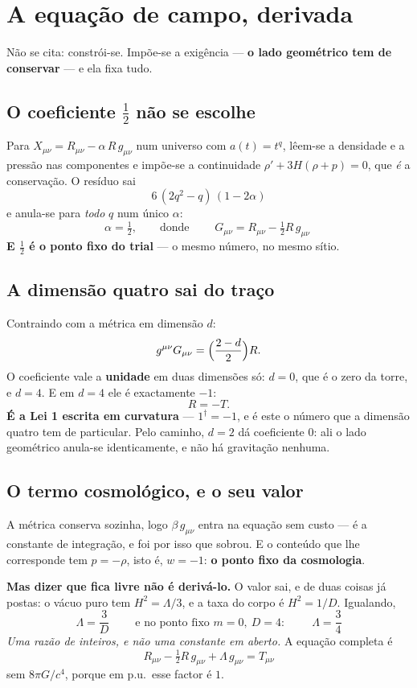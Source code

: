 \documentclass[11pt,a4paper]{article}
\newcommand{\dg}{^{\dagger}}
\begin{document}
\section{A equação de campo, derivada}\label{sec:campo2}

Não se cita: constrói-se. Impõe-se a exigência --- \textbf{o lado geométrico tem de conservar} --- e
ela fixa tudo.

\subsection*{O coeficiente $\tfrac12$ não se escolhe}

Para $X_{\mu\nu}=R_{\mu\nu}-\alpha\,R\,g_{\mu\nu}$ num universo com $a(t)=t^q$, lêem-se a densidade
e a pressão nas componentes e impõe-se a continuidade $\rho'+3H(\rho+p)=0$, que \emph{é} a
conservação. O resíduo sai
\[
  \boxed{\;6\,(2q^2-q)\,(1-2\alpha)\;}
\]
e anula-se para \emph{todo} $q$ num único $\alpha$:
\[
  \alpha=\tfrac12,\qquad\text{donde}\qquad \boxed{\;G_{\mu\nu}=R_{\mu\nu}-\tfrac12R\,g_{\mu\nu}\;}
\]
\textbf{E $\tfrac12$ é o ponto fixo do trial} --- o mesmo número, no mesmo sítio.

\subsection*{A dimensão quatro sai do traço}

Contraindo com a métrica em dimensão $d$:
\[
  g^{\mu\nu}G_{\mu\nu}=\Bigl(\frac{2-d}{2}\Bigr)R .
\]
O coeficiente vale a \textbf{unidade} em duas dimensões só: $d=0$, que é o zero da torre, e
$d=4$. E em $d=4$ ele é exactamente $-1$:
\[
  R=-T .
\]
\textbf{É a Lei 1 escrita em curvatura} --- $1\dg=-1$, e é este o número que a dimensão quatro tem
de particular. Pelo caminho, $d=2$ dá coeficiente $0$: ali o lado geométrico anula-se
identicamente, e não há gravitação nenhuma.

\subsection*{O termo cosmológico, e o seu valor}

A métrica conserva sozinha, logo $\beta\,g_{\mu\nu}$ entra na equação sem custo --- é a constante de
integração, e foi por isso que sobrou. E o conteúdo que lhe corresponde tem $p=-\rho$, isto é,
$w=-1$: \textbf{o ponto fixo da cosmologia}.

\smallskip
\noindent \textbf{Mas dizer que fica livre não é derivá-lo.} O valor sai, e de duas coisas já
postas: o vácuo puro tem $H^2=\Lambda/3$, e a taxa do corpo é $H^2=1/D$. Igualando,
\[
  \boxed{\;\Lambda=\frac{3}{D}\;}
  \qquad\text{e no ponto fixo } m=0,\ D=4:\qquad
  \boxed{\;\Lambda=\frac34\;}
\]
\emph{Uma razão de inteiros, e não uma constante em aberto.} A equação completa é
\[
  \boxed{\;R_{\mu\nu}-\tfrac12R\,g_{\mu\nu}+\Lambda\,g_{\mu\nu}=T_{\mu\nu}\;}
\]
sem $8\pi G/c^4$, porque em p.u.\ esse factor é $1$.
\end{document}
